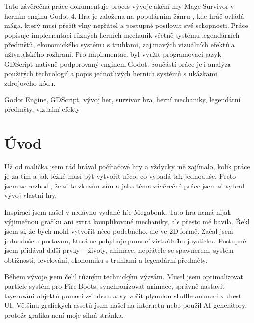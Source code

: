 \documentclass[12pt, a4paper,
oneside
]{report}
\begin{document}
	\clearpage

	
	\noindent Tato závěrečná práce dokumentuje proces vývoje akční hry Mage Survivor v herním enginu Godot 4. Hra je založena na populárním žánru , kde hráč ovládá mága, který musí přežít vlny nepřátel a postupně posilovat své schopnosti. Práce popisuje implementaci různých herních mechanik včetně systému legendárních předmětů, ekonomického systému s truhlami, zajimavých vizuálních efektů a uživatelského rozhraní. Pro implementaci byl využit programovací jazyk GDScript nativně podporovaný enginem Godot. Součástí práce je i analýza použitých technologií a popis jednotlivých herních systémů s ukázkami zdrojového kódu.
	
	\vspace{18pt}
	
	
	\noindent Godot Engine, GDScript, vývoj her, survivor hra, herní mechaniky, legendární předměty, vizuální efekty
	
	\clearpage

	\tableofcontents

	\setcounter{page}{1}

	\chapter*{Úvod}
	
	Už od malička jsem rád hrával počítačové hry a vždycky mě zajímalo, kolik práce je za tím a jak těžké musí být vytvořit něco, co vypadá tak jednoduše. Proto jsem se rozhodl, že si to zkusím sám a jako téma závěrečné práce jsem si vybral vývoj vlastní hry.
	
	Inspiraci jsem našel v nedávno vydané hře Megabonk. Tato hra nemá nijak výjimečnou grafiku ani extra komplikované mechaniky, ale přesto mě bavila. Řekl jsem si, že bych mohl vytvořit něco podobného, ale ve 2D formě. Začal jsem jednoduše s postavou, která se pohybuje pomocí virtuálního joysticku. Postupně jsem přidával další prvky -- životy, animace, nepřátele se spawnerem, systém obtížnosti, levelování, ekonomiku s truhlami a legendární předměty.
	
	Během vývoje jsem čelil různým technickým výzvám. Musel jsem optimalizovat particle systém pro Fire Boots, synchronizovat animace, správně nastavit layerování objektů pomocí z-indexu a vytvořit plynulou shuffle animaci v chest UI. Většinu grafických assetů jsem našel na internetu nebo použil AI generátory, protože grafika není moje silná stránka.
	
\end{document}
